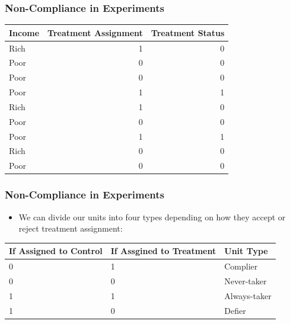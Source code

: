 \documentclass[xcolor=x11names,compress]{beamer}\usepackage[]{graphicx}\usepackage[]{color}
\renewcommand{\(}{\begin{columns}}
\renewcommand{\)}{\end{columns}}
\newcommand{\<}[1]{\begin{column}{#1}}
\renewcommand{\>}{\end{column}}
\begin{document}
\begin{frame}
\frametitle{Non-Compliance in Experiments}
\begin{table}[htbp]
  \centering
    \begin{tabular}{l|r|r}
    Income & \multicolumn{1}{l}{Treatment Assignment} & \multicolumn{1}{l}{Treatment Status} \\
    \hline
    Rich  & 1     & 0 \\
    Poor  & 0     & 0 \\
    Poor  & 0     & 0 \\
    Poor  & 1     & 1 \\
    Rich  & 1     & 0 \\
    Poor  & 0     & 0 \\
    Poor  & 1     & 1 \\
    Rich  & 0     & 0 \\
    Poor  & 0     & 0 \\
    \end{tabular}%
  \label{tab:addlabel}%
\end{table}%
\end{frame}

\begin{frame}
\frametitle{Non-Compliance in Experiments}
\begin{itemize}
\item We can divide our units into four types depending on how they accept or reject treatment assignment:
\end{itemize}
\begin{table}[htbp]
  \centering
    \begin{tabular}{|p{3cm}|p{3cm}|p{3cm}|}
    \hline
    \multicolumn{1}{|p{3cm}|}{\textbf{If Assigned to Control}} & \multicolumn{1}{p{3cm}|}{\textbf{If Assgined to Treatment}} & \textbf{Unit Type} \bigstrut\\
    \hline
    0     & 1     & Complier \bigstrut\\
    \hline
    0     & 0     & Never-taker \bigstrut\\
    \hline
    1     & 1     & Always-taker \bigstrut\\
    \hline
    1     & 0     & Defier \bigstrut\\
    \hline
    \end{tabular}%
  \label{tab:addlabel}%
\end{table}%
\end{frame}
\end{document}
